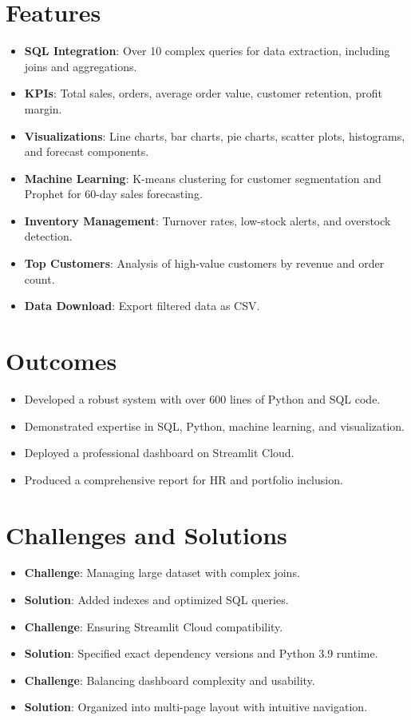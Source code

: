 \documentclass[12pt]{article}
\begin{document}
\section{Features}
\begin{itemize}
    \item \textbf{SQL Integration}: Over 10 complex queries for data extraction, including joins and aggregations.
    \item \textbf{KPIs}: Total sales, orders, average order value, customer retention, profit margin.
    \item \textbf{Visualizations}: Line charts, bar charts, pie charts, scatter plots, histograms, and forecast components.
    \item \textbf{Machine Learning}: K-means clustering for customer segmentation and Prophet for 60-day sales forecasting.
    \item \textbf{Inventory Management}: Turnover rates, low-stock alerts, and overstock detection.
    \item \textbf{Top Customers}: Analysis of high-value customers by revenue and order count.
    \item \textbf{Data Download}: Export filtered data as CSV.
\end{itemize}

\section{Outcomes}
\begin{itemize}
    \item Developed a robust system with over 600 lines of Python and SQL code.
    \item Demonstrated expertise in SQL, Python, machine learning, and visualization.
    \item Deployed a professional dashboard on Streamlit Cloud.
    \item Produced a comprehensive report for HR and portfolio inclusion.
\end{itemize}

\section{Challenges and Solutions}
\begin{itemize}
    \item \textbf{Challenge}: Managing large dataset with complex joins.
    \item \textbf{Solution}: Added indexes and optimized SQL queries.
    \item \textbf{Challenge}: Ensuring Streamlit Cloud compatibility.
    \item \textbf{Solution}: Specified exact dependency versions and Python 3.9 runtime.
    \item \textbf{Challenge}: Balancing dashboard complexity and usability.
    \item \textbf{Solution}: Organized into multi-page layout with intuitive navigation.
\end{itemize}
\end{document}
